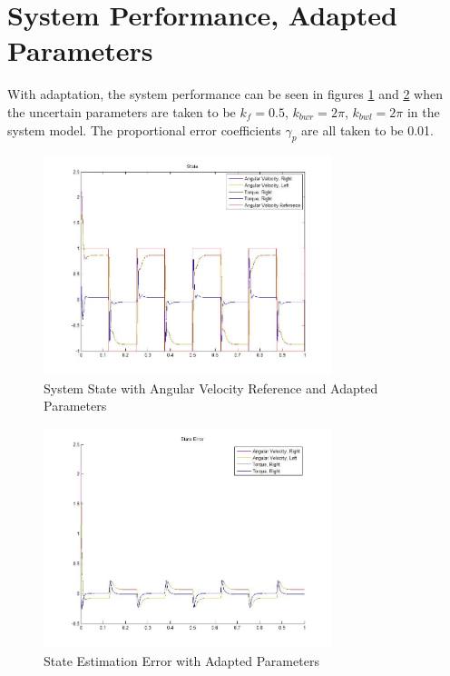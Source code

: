 \documentclass[letterpaper,12pt]{report}
\begin{document}
\section{System Performance, Adapted \mbox{Parameters}}
With adaptation, the system performance can be seen in figures \ref{fig:ssApDiagram1} and \ref{fig:seApDiagram1} when the uncertain parameters are taken to be $k_f = 0.5$, $k_{bwr} = 2\pi$, $k_{bwl} = 2\pi$ in the system model.
The proportional error coefficients $\gamma_p$ are all taken to be 0.01.
\begin{figure}[H!]
	\centering
	\includegraphics[width=0.75\textwidth]{Adapted_State1.jpg}
	\caption{System State with Angular Velocity Reference and Adapted Parameters}
	\label{fig:ssApDiagram1}
\end{figure}
\begin{figure}[H!]
	\centering
	\includegraphics[width=0.75\textwidth]{Adapted_StateError1.jpg}
	\caption{State Estimation Error with Adapted Parameters}
	\label{fig:seApDiagram1}
\end{figure}
\end{document}
